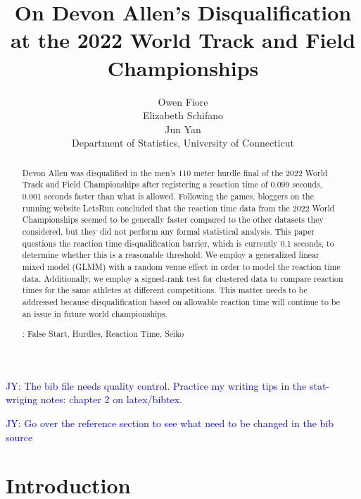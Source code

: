 \documentclass[12pt, letterpaper, titlepage]{article}
\title{On Devon Allen's Disqualification at the 2022 World Track and Field 
Championships}
\author{Owen Fiore\\
  Elizabeth Schifano\\
  Jun Yan\\[1ex]
  Department of Statistics, University of Connecticut\\
}
\date{}
\newcommand{\jy}[1]{\textcolor{blue}{JY: #1}}
\begin{document}
\maketitle

\begin{abstract}
Devon Allen was disqualified in the men's 110 meter hurdle final of the 2022
World Track and Field Championships after registering a reaction time of 0.099 
seconds, 0.001 seconds faster than what is allowed. Following the games, 
bloggers on the running website LetsRun concluded that the reaction time data 
from the 2022 World Championships seemed to be generally faster compared to the 
other datasets they considered, but they did not perform any formal 
statistical analysis. This paper questions the reaction time 
disqualification barrier, which is currently 0.1 seconds, to determine whether 
this is a reasonable threshold. We employ a generalized linear mixed model 
(GLMM) with a random venue effect in order to  model the reaction time data. 
Additionally, we employ a signed-rank test for clustered data to 
compare reaction times for the same athletes at different competitions. This 
matter needs to be addressed because disqualification based on allowable 
reaction time will continue to be an issue in future world championships.




\bigskip{}:
False Start, Hurdles, Reaction Time, Seiko 

\end{abstract}

\doublespace

\jy{The bib file needs quality control. Practice my writing tips in the
  stat-wriging notes: chapter 2 on latex/bibtex.}

\jy{Go over the reference section to see what need to be changed in the bib source}

\section{Introduction}
\label{sec:intro}
\end{document}
